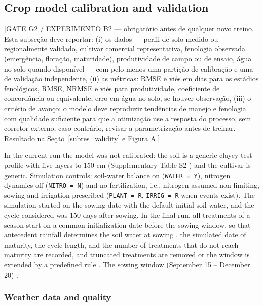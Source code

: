 \documentclass[times,final,authoryear]{elsarticle}
\begin{document}
\subsection{Crop model calibration and validation}
\label{subcropmodel}

[GATE G2 / EXPERIMENTO B2 --- obrigatório antes de qualquer novo treino. Esta subseção deve reportar: (i) os dados --- perfil de solo medido ou regionalmente validado, cultivar comercial representativa, fenologia observada (emergência, floração, maturidade), produtividade de campo ou de ensaio, água no solo quando disponível --- com pelo menos uma partição de calibração e uma de validação independente, (ii) as métricas: RMSE e viés em dias para os estádios fenológicos, RMSE, NRMSE e viés para produtividade, coeficiente de concordância ou equivalente, erro em água no solo, se houver observação, (iii) o critério de avanço: o modelo deve reproduzir tendências de manejo e fenologia com qualidade suficiente para que a otimização use a resposta do processo, sem corretor externo, caso contrário, revisar a parametrização antes de treinar. Resultado na Seção~\ref{subres_validity} e Figura A.]

In the current run the model was not calibrated: the soil is a generic clayey test profile with five layers to 150 cm (Supplementary Table S2 ) and the cultivar is generic. Simulation controls: soil-water balance on (\texttt{WATER = Y}), nitrogen dynamics off (\texttt{NITRO = N}) and no fertilization, i.e., nitrogen assumed non-limiting, sowing and irrigation prescribed (\texttt{PLANT = R}, \texttt{IRRIG = R} when events exist). The simulation started on the sowing date with the default initial soil water, and the cycle considered was 150 days after sowing. In the final run, all treatments of a season start on a common initialization date before the sowing window, so that antecedent rainfall determines the soil water at sowing , the simulated date of maturity, the cycle length, and the number of treatments that do not reach maturity are recorded, and truncated treatments are removed or the window is extended by a predefined rule . The sowing window (September 15 -- December 20) .

\subsubsection{Weather data and quality}
\label{subweather}
\end{document}
